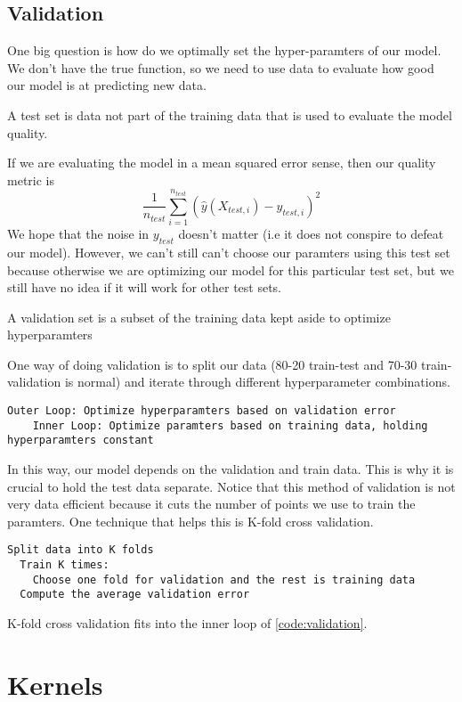 \subsection{Validation}
One big question is how do we optimally set the hyper-paramters of our model. We don't have the true function, so we need to use data to evaluate how good our model is at predicting new data.
\begin{definition}
  A test set is data not part of the training data that is used to evaluate the model quality.
  \label{defn:test-set}
\end{definition}
If we are evaluating the model in a mean squared error sense, then our quality metric is $$\frac{1}{n_{test}}\sum_{i=1}^{n_{test}}(\hat{y}(X_{test,i})-y_{test,i})^2$$
We hope that the noise in $y_{test}$ doesn't matter (i.e it does not conspire to defeat our model). However, we can't still can't choose our paramters using this test set because otherwise we are optimizing our model for this particular test set, but we still have no idea if it will work for other test sets.
\begin{definition}
  A validation set is a subset of the training data kept aside to optimize hyperparamters
  \label{defn:val-set}
\end{definition}
One way of doing validation is to split our data (80-20 train-test and 70-30 train-validation is normal) and iterate through different hyperparameter combinations.
\begin{lstlisting}[caption={Validation Pseudocode}, label={code:validation}]
  Outer Loop: Optimize hyperparamters based on validation error
    Inner Loop: Optimize paramters based on training data, holding hyperparamters constant
\end{lstlisting}
In this way, our model depends on the validation and train data. This is why it is crucial to hold the test data separate.
Notice that this method of validation is not very data efficient because it cuts the number of points we use to train the paramters. One technique that helps this is K-fold cross validation.
\begin{lstlisting}[caption={K-Fold Cross Validation Pseudocode}, label={code:k-fold}]
  Split data into K folds
  Train K times:
    Choose one fold for validation and the rest is training data
  Compute the average validation error
\end{lstlisting}
K-fold cross validation fits into the inner loop of \cref{code:validation}.


\section{Kernels}
